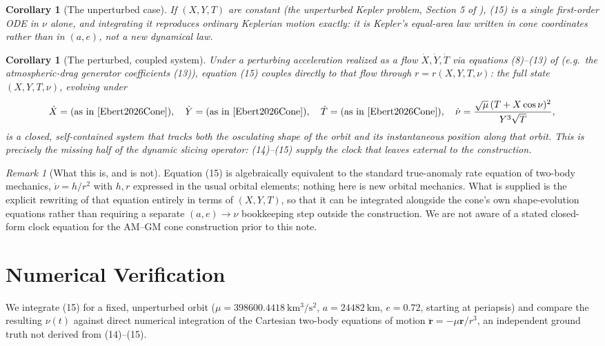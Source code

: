 \documentclass[12pt]{amsart}
\theoremstyle{plain}
\newtheorem{corollary}[theorem]{Corollary}
\theoremstyle{remark}
\newtheorem*{remark}{Remark}
\begin{document}
\begin{corollary}[The unperturbed case]
If $(X,Y,T)$ are constant (the unperturbed Kepler problem, Section 5 of \cite{Ebert2026Cone}), (15) is a single first-order ODE in $\nu$ alone, and integrating it reproduces ordinary Keplerian motion exactly: it is Kepler's equal-area law written in cone coordinates rather than in $(a,e)$, not a new dynamical law.
\end{corollary}

\begin{corollary}[The perturbed, coupled system]
Under a perturbing acceleration realized as a flow $\dot X, \dot Y, \dot T$ via equations (8)--(13) of \cite{Ebert2026Cone} (e.g.\ the atmospheric-drag generator coefficients (13)), equation (15) couples directly to that flow through $r=r(X,Y,T,\nu)$: the full state $(X,Y,T,\nu)$, evolving under
\[
\dot X = \text{(as in \cite{Ebert2026Cone})},\quad
\dot Y = \text{(as in \cite{Ebert2026Cone})},\quad
\dot T = \text{(as in \cite{Ebert2026Cone})},\quad
\dot\nu = \frac{\sqrt{\mu}\,(T+X\cos\nu)^2}{Y^3\sqrt T},
\]
is a closed, self-contained system that tracks both the osculating shape of the orbit and its instantaneous position along that orbit. This is precisely the missing half of the dynamic slicing operator: (14)--(15) supply the clock that \cite{Ebert2026Cone} leaves external to the construction.
\end{corollary}

\begin{remark}[What this is, and is not]
Equation (15) is algebraically equivalent to the standard true-anomaly rate equation of two-body mechanics, $\dot\nu=h/r^2$ with $h,r$ expressed in the usual orbital elements; nothing here is new orbital mechanics. What is supplied is the explicit rewriting of that equation entirely in terms of $(X,Y,T)$, so that it can be integrated alongside the cone's own shape-evolution equations rather than requiring a separate $(a,e)\to\nu$ bookkeeping step outside the construction. We are not aware of a stated closed-form clock equation for the AM--GM cone construction prior to this note.
\end{remark}

\section{Numerical Verification}

We integrate (15) for a fixed, unperturbed orbit ($\mu=398600.4418\ \mathrm{km^3/s^2}$, $a=24482\ \mathrm{km}$, $e=0.72$, starting at periapsis) and compare the resulting $\nu(t)$ against direct numerical integration of the Cartesian two-body equations of motion $\ddot{\mathbf r}=-\mu\mathbf r/r^3$, an independent ground truth not derived from (14)--(15).
\end{document}
